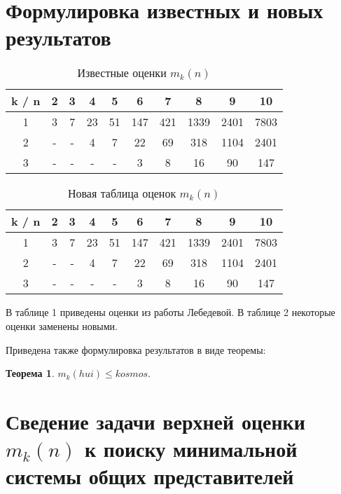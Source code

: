 \documentclass{article}
\newtheorem{thm}{Теорема}
\begin{document}
	\section{Формулировка известных и новых результатов}

    \begin{table}[]
    \caption{Известные оценки $m_k(n)$}
    \label{tabular:timesandtenses}
    \begin{center}
    \begin{tabular}{cccccccccc}
    \hline
    k / n & 2 & 3 & 4 & 5 & 6 & 7 & 8 & 9 & 10 \\
    \hline
    1 & 3 & 7 & 23 & 51 & 147 & 421 & 1339 & 2401 & 7803 \\
    \hline
    2 & - & - & 4 & 7 & 22 & 69 & 318 & 1104 & 2401 \\
    \hline
    3 & - & - & - & - & 3 & 8 & 16 & 90 & 147\\
    \hline
    \end{tabular}
    \end{center}
    \end{table}
	
    
    \begin{table}[]
    \caption{Новая таблица оценок $m_k(n)$}
    \label{tabular:timesandtenses}
    \begin{center}
    \begin{tabular}{cccccccccc}
    \hline
    k / n & 2 & 3 & 4 & 5 & 6 & 7 & 8 & 9 & 10 \\
    \hline
    1 & 3 & 7 & 23 & 51 & 147 & 421 & 1339 & 2401 & 7803 \\
    \hline
    2 & - & - & 4 & 7 & 22 & 69 & 318 & 1104 & 2401 \\
    \hline
    3 & - & - & - & - & 3 & 8 & 16 & 90 & 147\\
    \hline
    \end{tabular}
    \end{center}
    \end{table}
		
        В таблице 1 приведены оценки из работы Лебедевой. В таблице 2 некоторые оценки заменены новыми.

        Приведена также формулировка результатов в виде теоремы:

        \begin{thm}
            $m_k(hui) \leq kosmos.$
        \end{thm}

	\section{Сведение задачи верхней оценки $m_k(n)$ к поиску минимальной системы общих представителей}
\end{document}
